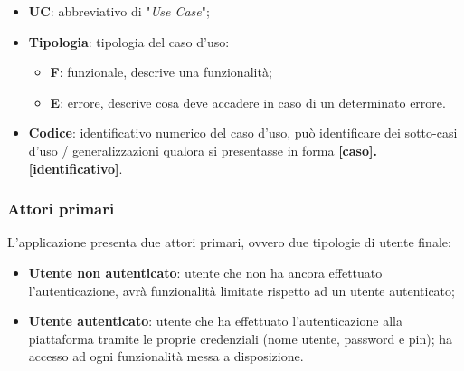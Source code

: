 \begin{itemize}
    \item \textbf{UC}: abbreviativo di "\textit{Use Case}";
    \item \textbf{Tipologia}: tipologia del caso d'uso:
        \begin{itemize}
            \item \textbf{F}: funzionale, descrive una funzionalità;
            \item \textbf{E}: errore, descrive cosa deve accadere in caso di un determinato errore.
        \end{itemize}
    \item \textbf{Codice}: identificativo numerico del caso d’uso, può identificare dei sotto-casi d’uso / generalizzazioni qualora si presentasse in forma \textbf{[caso].[identificativo]}.
\end{itemize}

\subsubsection*{Attori primari}
L’applicazione presenta due attori primari, ovvero due tipologie di utente finale:
\begin{itemize}
    \item \textbf{Utente non autenticato}: utente che non ha ancora effettuato l’autenticazione, avrà funzionalità limitate rispetto ad un utente autenticato;
    \item \textbf{Utente autenticato}: utente che ha effettuato l’autenticazione alla piattaforma tramite le proprie credenziali (nome utente, password e pin); ha accesso ad ogni funzionalità messa a disposizione.
\end{itemize}

\label{subsubsec:casi-d'uso}
